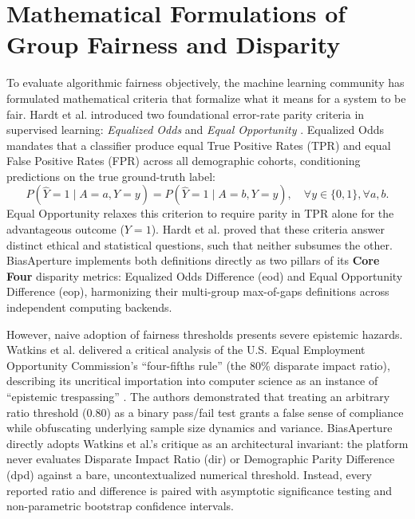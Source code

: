 \section{Mathematical Formulations of Group Fairness and Disparity}
\label{sec:lit_fairness_math}

To evaluate algorithmic fairness objectively, the machine learning community has formulated mathematical criteria that formalize what it means for a system to be fair. Hardt et al. introduced two foundational error-rate parity criteria in supervised learning: \emph{Equalized Odds} and \emph{Equal Opportunity} \cite{hardt2016equality}. Equalized Odds mandates that a classifier produce equal True Positive Rates (TPR) and equal False Positive Rates (FPR) across all demographic cohorts, conditioning predictions on the true ground-truth label:
\begin{equation}
    P(\hat{Y} = 1 \mid A = a, Y = y) = P(\hat{Y} = 1 \mid A = b, Y = y), \quad \forall y \in \{0, 1\}, \forall a, b.
\end{equation}
Equal Opportunity relaxes this criterion to require parity in TPR alone for the advantageous outcome ($Y=1$). Hardt et al. proved that these criteria answer distinct ethical and statistical questions, such that neither subsumes the other. BiasAperture implements both definitions directly as two pillars of its \textbf{Core Four} disparity metrics: Equalized Odds Difference (\gls{eod}) and Equal Opportunity Difference (\gls{eop}), harmonizing their multi-group max-of-gaps definitions across independent computing backends.

However, naive adoption of fairness thresholds presents severe epistemic hazards. Watkins et al. delivered a critical analysis of the U.S. Equal Employment Opportunity Commission's ``four-fifths rule'' (the 80\% disparate impact ratio), describing its uncritical importation into computer science as an instance of ``epistemic trespassing'' \cite{watkins2022fourfifths}. The authors demonstrated that treating an arbitrary ratio threshold ($0.80$) as a binary pass/fail test grants a false sense of compliance while obfuscating underlying sample size dynamics and variance. BiasAperture directly adopts Watkins et al.'s critique as an architectural invariant: the platform never evaluates Disparate Impact Ratio (\gls{dir}) or Demographic Parity Difference (\gls{dpd}) against a bare, uncontextualized numerical threshold. Instead, every reported ratio and difference is paired with asymptotic significance testing and non-parametric bootstrap confidence intervals.

